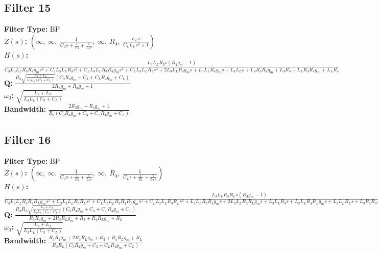 \documentclass{article}
\begin{document}
\subsection*{Filter 15}
\textbf{Filter Type:} BP \\ 
\textbf{$Z(s)$:} $\left( \infty, \  \infty, \  \frac{1}{C_{3} s + \frac{1}{R_{3}} + \frac{1}{L_{3} s}}, \  \infty, \  R_{4}, \  \frac{L_{L} s}{C_{L} L_{L} s^{2} + 1}\right)$ \\ 
\textbf{$H(s)$:} $\frac{L_{3} L_{L} R_{3} s \left(R_{4} g_{m} - 1\right)}{C_{3} L_{3} L_{L} R_{3} R_{4} g_{m} s^{2} + C_{3} L_{3} L_{L} R_{3} s^{2} + C_{L} L_{3} L_{L} R_{3} R_{4} g_{m} s^{2} + C_{L} L_{3} L_{L} R_{3} s^{2} + 2 L_{3} L_{L} R_{3} g_{m} s + L_{3} L_{L} R_{4} g_{m} s + L_{3} L_{L} s + L_{3} R_{3} R_{4} g_{m} + L_{3} R_{3} + L_{L} R_{3} R_{4} g_{m} + L_{L} R_{3}}$ \\ 
\textbf{Q:} $\frac{R_{3} \sqrt{\frac{L_{3} + L_{L}}{L_{3} L_{L} \left(C_{3} + C_{L}\right)}} \left(C_{3} R_{4} g_{m} + C_{3} + C_{L} R_{4} g_{m} + C_{L}\right)}{2 R_{3} g_{m} + R_{4} g_{m} + 1}$ \\ 
\textbf{$\omega_0$:} $\sqrt{\frac{L_{3} + L_{L}}{L_{3} L_{L} \left(C_{3} + C_{L}\right)}}$ \\ 
\textbf{Bandwidth:} $\frac{2 R_{3} g_{m} + R_{4} g_{m} + 1}{R_{3} \left(C_{3} R_{4} g_{m} + C_{3} + C_{L} R_{4} g_{m} + C_{L}\right)}$ \\ 
\subsection*{Filter 16}
\textbf{Filter Type:} BP \\ 
\textbf{$Z(s)$:} $\left( \infty, \  \infty, \  \frac{1}{C_{3} s + \frac{1}{R_{3}} + \frac{1}{L_{3} s}}, \  \infty, \  R_{4}, \  \frac{1}{C_{L} s + \frac{1}{R_{L}} + \frac{1}{L_{L} s}}\right)$ \\ 
\textbf{$H(s)$:} $\frac{L_{3} L_{L} R_{3} R_{L} s \left(R_{4} g_{m} - 1\right)}{C_{3} L_{3} L_{L} R_{3} R_{4} R_{L} g_{m} s^{2} + C_{3} L_{3} L_{L} R_{3} R_{L} s^{2} + C_{L} L_{3} L_{L} R_{3} R_{4} R_{L} g_{m} s^{2} + C_{L} L_{3} L_{L} R_{3} R_{L} s^{2} + L_{3} L_{L} R_{3} R_{4} g_{m} s + 2 L_{3} L_{L} R_{3} R_{L} g_{m} s + L_{3} L_{L} R_{3} s + L_{3} L_{L} R_{4} R_{L} g_{m} s + L_{3} L_{L} R_{L} s + L_{3} R_{3} R_{4} R_{L} g_{m} + L_{3} R_{3} R_{L} + L_{L} R_{3} R_{4} R_{L} g_{m} + L_{L} R_{3} R_{L}}$ \\ 
\textbf{Q:} $\frac{R_{3} R_{L} \sqrt{\frac{L_{3} + L_{L}}{L_{3} L_{L} \left(C_{3} + C_{L}\right)}} \left(C_{3} R_{4} g_{m} + C_{3} + C_{L} R_{4} g_{m} + C_{L}\right)}{R_{3} R_{4} g_{m} + 2 R_{3} R_{L} g_{m} + R_{3} + R_{4} R_{L} g_{m} + R_{L}}$ \\ 
\textbf{$\omega_0$:} $\sqrt{\frac{L_{3} + L_{L}}{L_{3} L_{L} \left(C_{3} + C_{L}\right)}}$ \\ 
\textbf{Bandwidth:} $\frac{R_{3} R_{4} g_{m} + 2 R_{3} R_{L} g_{m} + R_{3} + R_{4} R_{L} g_{m} + R_{L}}{R_{3} R_{L} \left(C_{3} R_{4} g_{m} + C_{3} + C_{L} R_{4} g_{m} + C_{L}\right)}$ \\ 
\end{document}

